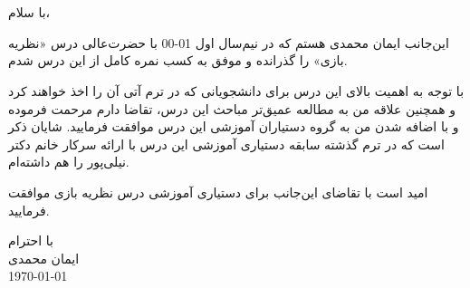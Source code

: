 \documentclass[10pt]{letter}
\begin{document}
\pagestyle{fancy}

\renewcommand{\headrulewidth}{0pt}


\vspace*{1.5cm}
	
	\\
	\\
	
	\zar
	با سلام،
	
	این‌جانب ایمان محمدی هستم که در نیم‌سال اول 01-00 با حضرت‌عالی درس «نظریه بازی» را گذرانده و موفق به کسب نمره کامل از این درس شدم. 
	
	با توجه به اهمیت بالای این درس برای دانشجویانی که در ترم آتی آن را اخذ خواهند کرد و همچنین علاقه من به مطالعه عمیق‌تر مباحث این درس، تقاضا دارم  مرحمت فرموده و با اضافه شدن من به گروه دستیاران آموزشی این درس موافقت فرمایید. شایان ذکر است که در ترم‌ گذشته سابقه دستیاری آموزشی این درس با ارائه سرکار خانم دکتر نیلی‌پور را هم داشته‌ام.
	
	امید است با تقاضای این‌جانب برای دستیاری آموزشی درس نظریه بازی موافقت فرمایید.
	
	
	\begin{flushleft}
		
		\begin{varwidth}{\linewidth}\centering
		\hspace*{0.2cm}	با احترام\\
	\hspace*{0.2cm}	ایمان محمدی\\
			\hspace*{0.2cm} \today
		\end{varwidth}
		

		
	\end{flushleft}
	 
	
\end{document}
